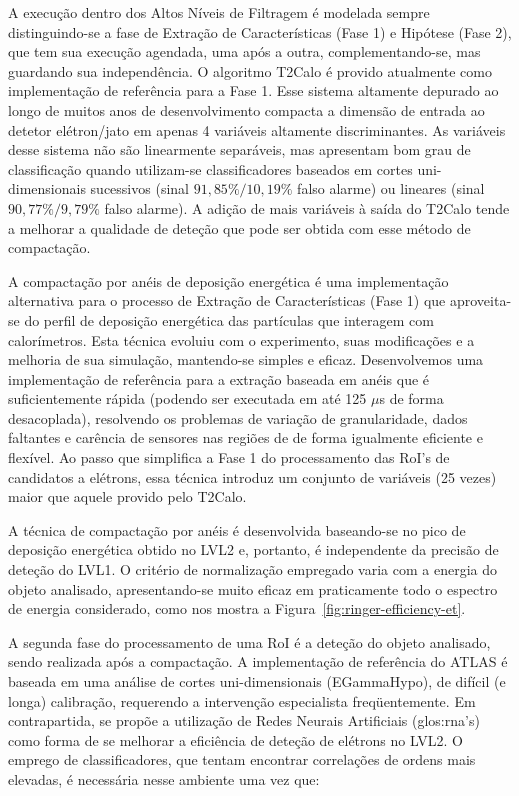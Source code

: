A execução dentro dos Altos Níveis de Filtragem é modelada sempre
distinguindo-se a fase de Extração de Características (Fase 1) e Hipótese
(Fase 2), que tem sua execução agendada, uma após a outra, complementando-se,
mas guardando sua independência. O algoritmo T2Calo é provido atualmente como
implementação de referência para a Fase 1. Esse sistema altamente depurado ao
longo de muitos anos de desenvolvimento compacta a dimensão de entrada ao
detetor elétron/jato em apenas 4 variáveis altamente discriminantes. As
variáveis desse sistema não são linearmente separáveis, mas apresentam bom
grau de classificação quando utilizam-se classificadores baseados em cortes
uni-dimensionais sucessivos (sinal $91,85\%/10,19\%$ falso alarme) ou lineares
(sinal $90,77\%/9,79\%$ falso alarme). A adição de mais variáveis à saída do
T2Calo tende a melhorar a qualidade de deteção que pode ser obtida com esse
método de compactação.

A compactação por anéis de deposição energética é uma implementação
alternativa para o processo de Extração de Características (Fase 1) que
aproveita-se do perfil de deposição energética das partículas que interagem
com calorímetros. Esta técnica evoluiu com o experimento, suas modificações e
a melhoria de sua simulação, mantendo-se simples e eficaz. Desenvolvemos uma
implementação de referência para a extração baseada em anéis que é
suficientemente rápida (podendo ser executada em até 125 $\mu$s de forma
desacoplada), resolvendo os problemas de variação de granularidade, dados
faltantes e carência de sensores nas regiões de  de forma
igualmente eficiente e flexível. Ao passo que simplifica a Fase 1 do
processamento das RoI's de candidatos a elétrons, essa técnica introduz um
conjunto de variáveis (25 vezes) maior que aquele provido pelo T2Calo.

A técnica de compactação por anéis é desenvolvida baseando-se no pico de
deposição energética obtido no LVL2 e, portanto, é independente da precisão de
deteção do LVL1. O critério de normalização empregado varia com a energia do
objeto analisado, apresentando-se muito eficaz em praticamente todo o espectro
de energia considerado, como nos mostra a
Figura~\ref{fig:ringer-efficiency-et}.

A segunda fase do processamento de uma RoI é a deteção do objeto analisado,
sendo realizada após a compactação. A implementação de referência do ATLAS é
baseada em uma análise de cortes uni-dimensionais (EGammaHypo), de difícil (e
longa) calibração, requerendo a intervenção especialista freqüentemente. Em
contrapartida, se propõe a utilização de Redes Neurais Artificiais
(\gls{glos:rna}'s) como forma de se melhorar a eficiência de deteção de
elétrons no LVL2. O emprego de classificadores, que tentam encontrar
correlações de ordens mais elevadas, é necessária nesse ambiente uma vez que:

